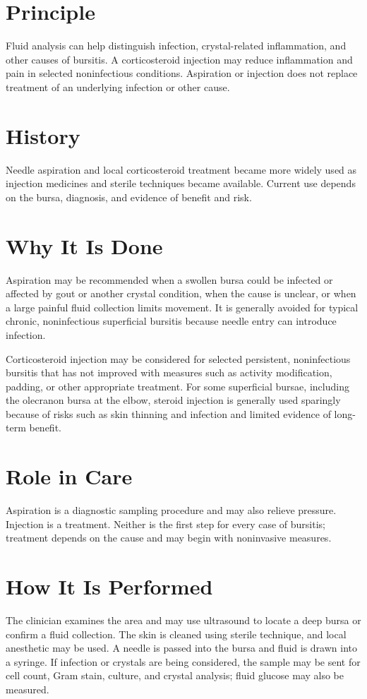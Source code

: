 \section*{Principle}
Fluid analysis can help distinguish infection, crystal-related inflammation, and other causes of bursitis. A corticosteroid injection may reduce inflammation and pain in selected noninfectious conditions. Aspiration or injection does not replace treatment of an underlying infection or other cause.

\section*{History}
Needle aspiration and local corticosteroid treatment became more widely used as injection medicines and sterile techniques became available. Current use depends on the bursa, diagnosis, and evidence of benefit and risk.

\section*{Why It Is Done}
Aspiration may be recommended when a swollen bursa could be infected or affected by gout or another crystal condition, when the cause is unclear, or when a large painful fluid collection limits movement. It is generally avoided for typical chronic, noninfectious superficial bursitis because needle entry can introduce infection.

Corticosteroid injection may be considered for selected persistent, noninfectious bursitis that has not improved with measures such as activity modification, padding, or other appropriate treatment. For some superficial bursae, including the olecranon bursa at the elbow, steroid injection is generally used sparingly because of risks such as skin thinning and infection and limited evidence of long-term benefit.

\section*{Role in Care}
Aspiration is a diagnostic sampling procedure and may also relieve pressure. Injection is a treatment. Neither is the first step for every case of bursitis; treatment depends on the cause and may begin with noninvasive measures.

\section*{How It Is Performed}
The clinician examines the area and may use ultrasound to locate a deep bursa or confirm a fluid collection. The skin is cleaned using sterile technique, and local anesthetic may be used. A needle is passed into the bursa and fluid is drawn into a syringe. If infection or crystals are being considered, the sample may be sent for cell count, Gram stain, culture, and crystal analysis; fluid glucose may also be measured.

